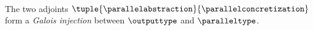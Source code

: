 ~

The two adjoints $\tuple{\parallelabstraction}{\parallelconcretization}$ form a \emph{Galois injection} between
$\outputtype$ and $\paralleltype$.
